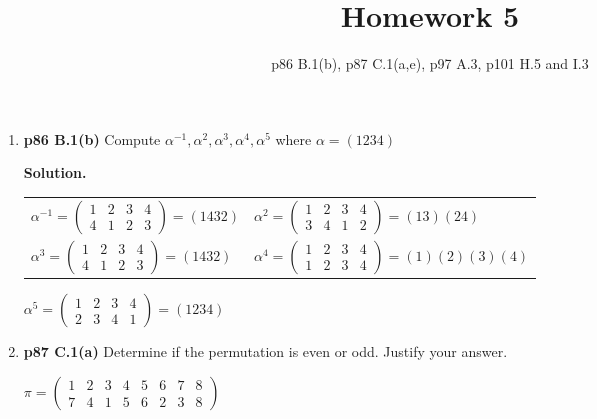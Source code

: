 \documentclass[11pt]{article}
\begin{document}
\title{Homework 5}
\date{p86 B.1(b), p87 C.1(a,e), p97 A.3, p101 H.5 and I.3}
\maketitle

\thispagestyle{fancy}  
\pagestyle{fancy}      

\begin{enumerate}

\item {\bfseries p86 B.1(b)} Compute $\alpha^{-1}, \alpha^2, \alpha^3, \alpha^4, \alpha^5$ where $\alpha = (1234)$
  
	{\bfseries Solution.}
	
	\begin{tabular}{ l l }
	
	$\alpha^{-1} = \begin{pmatrix}
		1 & 2 & 3 & 4 \\
		4 & 1 & 2 & 3
	\end{pmatrix}
	= (1432)$ &
	$\alpha^2 = \begin{pmatrix}
		1 & 2 & 3 & 4 \\
		3 & 4 & 1 & 2
	\end{pmatrix}
	= (13)(24)$ \\
	
	$\alpha^3 = \begin{pmatrix}
		1 & 2 & 3 & 4 \\
		4 & 1 & 2 & 3
	\end{pmatrix}
	= (1432)$ &
	$\alpha^4 = \begin{pmatrix}
		1 & 2 & 3 & 4 \\
		1 & 2 & 3 & 4
	\end{pmatrix}
	= (1)(2)(3)(4)$
	
	\end{tabular}
	
	$\alpha^5 = \begin{pmatrix}
		1 & 2 & 3 & 4 \\
		2 & 3 & 4 & 1
	\end{pmatrix}
	= (1234)$

\item {\bfseries p87 C.1(a)} Determine if the permutation is even or odd. Justify your answer.
	
	$\pi = \begin{pmatrix}
		1 & 2 & 3 & 4 & 5 & 6 & 7 & 8 \\
		7 & 4 & 1 & 5 & 6 & 2 & 3 & 8
	\end{pmatrix}$
  

\end{enumerate}
\end{document}
